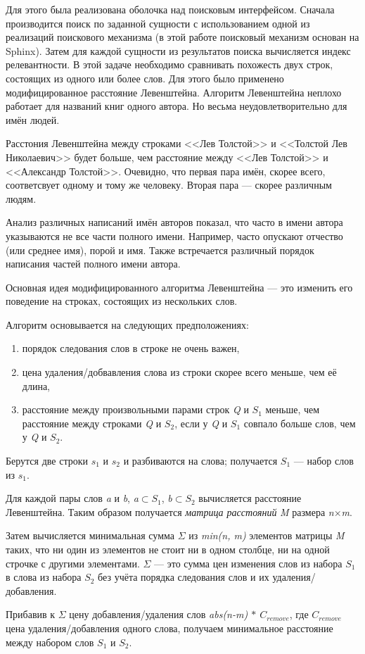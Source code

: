 Для этого была реализована оболочка над поисковым интерфейсом.
Сначала производится поиск по заданной сущности с использованием одной из реализаций поискового механизма (в этой работе поисковый механизм основан на Sphinx). Затем для каждой сущности из результатов поиска вычисляется индекс релевантности.
В этой задаче необходимо сравнивать похожесть двух строк, состоящих из одного или более слов.
Для этого было применено модифицированное расстояние Левенштейна.
Алгоритм Левенштейна \cite{distance} неплохо работает для названий книг одного автора.
Но весьма неудовлетворительно для имён людей.

Расстония Левенштейна между строками <<Лев Толстой>> и <<Толстой Лев Николаевич>> будет больше, 
чем расстояние между <<Лев Толстой>> и <<Александр Толстой>>.
Очевидно, что первая пара имён, скорее всего, соответсвует одному и тому же человеку. Вторая пара --- скорее различным людям.

Анализ различных написаний имён авторов показал, что часто в имени автора указываются не все части полного имени.
Например, часто опускают отчество (или среднее имя), порой и имя.
Также встречается различный порядок написания частей полного имени автора.

Основная идея модифицированного алгоритма Левенштейна --- это изменить его поведение на строках, состоящих из нескольких слов.

Алгоритм основывается на следующих предположениях:
\begin{enumerate}
	\item порядок следования слов в строке не очень важен,
	\item цена удаления/добвавления слова из строки скорее всего меньше, чем её длина,
	\item расстояние между произвольными парами строк \textit{Q} и \textit{$S_{1}$} меньше, 
	  	  чем расстояние между строками \textit{Q} и \textit{$S_{2}$},
		  если у \textit{Q} и \textit{$S_{1}$} совпало больше слов, чем у \textit{Q} и \textit{$S_{2}$}.
\end{enumerate}


{
Берутся две строки \textit{$s_{1}$} и \textit{$s_{2}$} и разбиваются на слова; получается \textit{$S_{1}$} --- набор слов из \textit{$s_{1}$}.

Для каждой пары слов \textit{a} и \textit{b}, \textit{a}$\subset$\textit{$S_{1}$}, \textit{b}$\subset$\textit{$S_{2}$} вычисляется  расстояние Левенштейна.
Таким образом получается {\em матрица расстояний} \textit{M} размера \textit{n}$\times$\textit{m}.

Затем вычисляется минимальная сумма $\Sigma$ из \textit{min(n, m)} элементов матрицы \textit{M} таких,
что ни один из элементов не стоит ни в одном столбце, ни на одной строчке с другими элементами.
$\Sigma$ --- это сумма цен изменения слов из набора \textit{$S_{1}$} в слова из набора \textit{$S_{2}$} без учёта порядка следования слов
и их удаления/добавления.

Прибавив к $\Sigma$ цену добавления/удаления слов \textit{abs(n-m) $\ast$ $C_{remove}$}, где \textit{$C_{remove}$} цена удаления/добавления одного слова, получаем минимальное расстояние между набором слов \textit{$S_{1}$} и \textit{$S_{2}$}.
}


